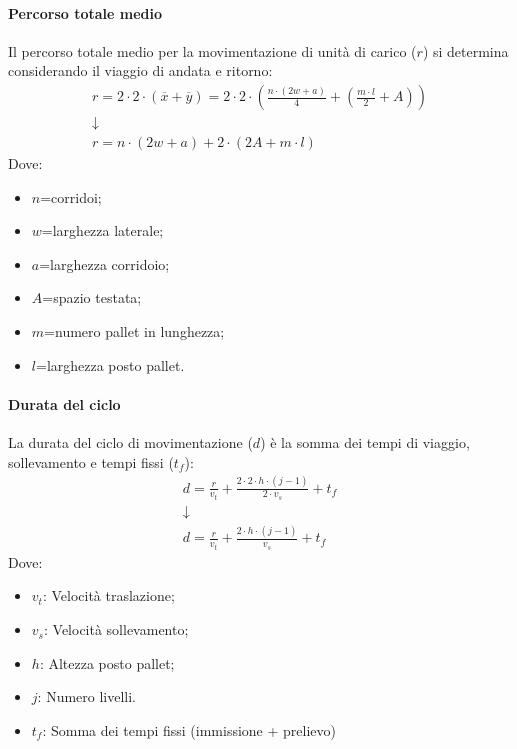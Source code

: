 \paragraph{Percorso totale medio} Il percorso totale medio per la movimentazione di unità di carico ($ r $) si determina considerando il viaggio di andata e ritorno:
\begin{gather*}
    r = 2 \cdot 2 \cdot (\overline{x}+\overline{y}) = 2 \cdot 2 \cdot (\frac{n \cdot (2w + a)}{4}+(\frac{m \cdot l}{2}+A)) \\
    \downarrow \\
    r = n \cdot (2w+a)+ 2 \cdot (2A+m \cdot l)
\end{gather*}
Dove:
\begin{itemize}
    \item $n$=corridoi;
    \item $w$=larghezza laterale;
    \item $a$=larghezza corridoio;
    \item $A$=spazio testata;
    \item $m$=numero pallet in lunghezza;
    \item $l$=larghezza posto pallet.
\end{itemize}

%
\paragraph{Durata del ciclo} La durata del ciclo di movimentazione ($ d $) è la somma dei tempi di viaggio, sollevamento e tempi fissi ($ t_{f} $):
\begin{gather*}
    d = \frac{r}{v_{t}}+\frac{2 \cdot 2 \cdot h \cdot (j-1)}{2 \cdot v_{s}} + t_{f} \\
    \downarrow \\
    d = \frac{r}{v_{t}}+\frac{2 \cdot h \cdot (j-1)}{v_{s}} + t_{f}
\end{gather*}
Dove:
\begin{itemize}
    \item $v_t$: Velocità traslazione;
    \item $v_s$: Velocità sollevamento;
    \item $h$: Altezza posto pallet;
    \item $j$: Numero livelli.
    \item $ t_{f} $: Somma dei tempi fissi (immissione + prelievo)
\end{itemize}

%

